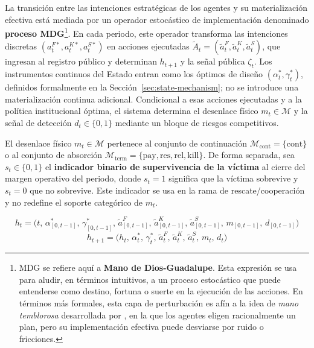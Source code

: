 \documentclass[12pt]{article}
\providecommand{\textcite}{\citet}
\newenvironment{fnnote}{%
  \begin{minipage}[t]{\linewidth}%
  \sloppy
}{\end{minipage}}
\theoremstyle{definition}
\theoremstyle{remark}
\newcommand{\1}{\mathbf{1}}
\begin{document}
La transición entre las intenciones estratégicas de los agentes y su materialización efectiva está mediada por un operador estocástico de implementación denominado \textbf{proceso MDG}\footnote{\begin{fnnote}
MDG se refiere aquí a \textbf{Mano de Dios-Guadalupe}. Esta expresión se usa para aludir, en términos intuitivos, a un proceso estocástico que puede entenderse como destino, fortuna o suerte en la ejecución de las acciones. En términos más formales, esta capa de perturbación es afín a la idea de \emph{mano temblorosa} desarrollada por \textcite{Selten1975Perfectness}, en la que los agentes eligen racionalmente un plan, pero su implementación efectiva puede desviarse por ruido o fricciones.
\end{fnnote}}. En cada periodo, este operador transforma las intenciones discretas $(a_t^{F\ast}, a_t^{K\ast}, a_t^{S\ast})$ en acciones ejecutadas $\tilde{A}_t = (\tilde{a}_t^F, \tilde{a}_t^K, \tilde{a}_t^S)$, que ingresan al registro público y determinan $h_{t+1}$ y la señal pública $\zeta_t$. Los instrumentos continuos del Estado entran como los óptimos de diseño $(\alpha_t^\ast,\gamma_t^\ast)$, definidos formalmente en la Sección~\ref{sec:state-mechanism}; no se introduce una materialización continua adicional. Condicional a esas acciones ejecutadas y a la política institucional óptima, el sistema determina el desenlace físico $m_t \in \mathcal{M}$ y la señal de detección $d_t \in \{0,1\}$ mediante un bloque de riesgos competitivos.


El desenlace físico $m_t\in\mathcal{M}$ pertenece al conjunto de continuación $\mathcal{M}_{\mathrm{cont}}=\{\mathrm{cont}\}$ o al conjunto de absorción $\mathcal{M}_{\mathrm{term}}=\{\mathrm{pay},\mathrm{res},\mathrm{rel},\mathrm{kill}\}$. De forma separada, sea $s_t\in\{0,1\}$ el \textbf{indicador binario de supervivencia de la víctima} al cierre del margen operativo del periodo, donde $s_t=1$ significa que la víctima sobrevive y $s_t=0$ que no sobrevive. Este indicador se usa en la rama de rescate/cooperación y no redefine el soporte categórico de $m_t$.


\begin{equation}
\label{eq:historia-publica}
h_t = \bigl(t,\, \alpha^\ast_{[0,t-1]},\, \gamma^\ast_{[0,t-1]},\, \tilde{a}^F_{[0,t-1]},\, \tilde{a}^K_{[0,t-1]},\, \tilde{a}^S_{[0,t-1]},\, m_{[0,t-1]},\, d_{[0,t-1]}\bigr)
\end{equation}
\begin{equation}
\label{eq:actualizacion-historia}
h_{t+1} = \bigl(h_t,\, \alpha_t^\ast,\, \gamma_t^\ast,\, \tilde{a}_t^F,\, \tilde{a}_t^K,\, \tilde{a}_t^S,\, m_t,\, d_t\bigr)
\end{equation}
\end{document}
